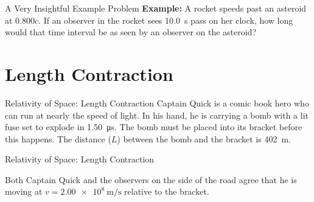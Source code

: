 \documentclass[12pt,compress,aspectratio=169]{beamer}
\newcommand{\bigsqrt}{\ensuremath\sqrt{1-\left(\dfrac vc\right)^2}}
\begin{document}



\begin{frame}{A Very Insightful Example Problem}
  \textbf{Example:} A rocket speeds past an asteroid at $0.800c$. If an
  observer in the rocket sees \SI{10.0}{\second} pass on her clock, how long
  would that time interval be as seen by an observer on the asteroid?


\end{frame}



\section{Length Contraction}

\begin{frame}{Relativity of Space: Length Contraction}
  Captain Quick is a comic book hero who can run at nearly the speed of light.
  In his hand, he is carrying a bomb with a lit fuse set to explode in
  \SI{1.50}{\micro\second}. The bomb must be placed into its bracket before
  this happens. The distance ($L$) between the bomb and the bracket is
  \SI{402}\metre.
\end{frame}


\begin{frame}{Relativity of Space: Length Contraction}
  \begin{center}
  \end{center}
  Both Captain Quick and the observers on the side of the road agree that
  he is moving at $v=\SI{2.00e8}{\metre\per\second}$ relative to the bracket.
\end{frame}
\end{document}
